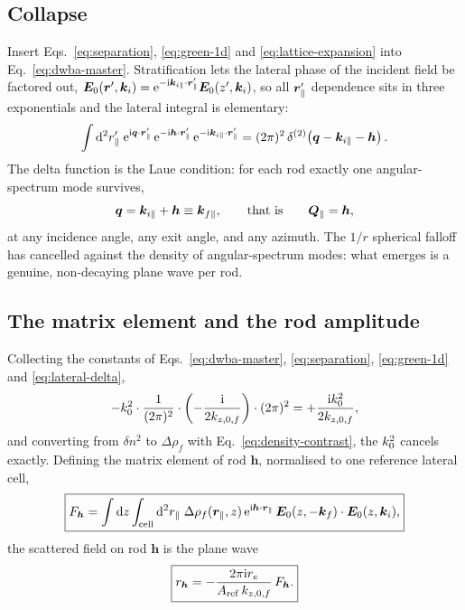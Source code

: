 \subsection{Collapse}

Insert Eqs.~\eqref{eq:separation}, \eqref{eq:green-1d} and
\eqref{eq:lattice-expansion} into Eq.~\eqref{eq:dwba-master}.  Stratification
lets the lateral phase of the incident field be factored out,
$\bm E_0(\bm r',\bm k_i)
=\mathrm{e}^{-\mathrm{i}\bm k_{i\parallel}\cdot\bm{r}_{\parallel}'}\bm E_0(z',\bm k_i)$, so all
$\bm{r}_{\parallel}'$ dependence sits in three exponentials and the lateral integral is
elementary:
\begin{equation}
  \int\mathop{}\!\mathrm{d}^2r_\parallel'\;
  \mathrm{e}^{\mathrm{i}\bm q\cdot\bm{r}_{\parallel}'}\,
  \mathrm{e}^{-\mathrm{i}\bm h\cdot\bm{r}_{\parallel}'}\,
  \mathrm{e}^{-\mathrm{i}\bm k_{i\parallel}\cdot\bm{r}_{\parallel}'}
  =(2\pi)^2\,\delta^{(2)}\!\left(\bm q-\bm k_{i\parallel}-\bm h\right).
  \label{eq:lateral-delta}
\end{equation}
The delta function is the Laue condition: for each rod exactly one
angular-spectrum mode survives,
\begin{equation}
  \bm q=\bm k_{i\parallel}+\bm h\equiv\bm k_{f\parallel},
  \qquad\text{that is}\qquad
  \bm{Q}_{\parallel}=\bm h,
  \label{eq:laue}
\end{equation}
at any incidence angle, any exit angle, and any azimuth.  The $1/r$ spherical
falloff has cancelled against the density of angular-spectrum modes: what
emerges is a genuine, non-decaying plane wave per rod.

\subsection{The matrix element and the rod amplitude}

Collecting the constants of Eqs.~\eqref{eq:dwba-master}, \eqref{eq:separation},
\eqref{eq:green-1d} and \eqref{eq:lateral-delta},
\begin{equation}
  -k_0^2\cdot\frac{1}{(2\pi)^2}
  \cdot\left(-\frac{\mathrm{i}}{2k_{z,0,f}}\right)\cdot(2\pi)^2
  =+\frac{\mathrm{i}k_0^2}{2k_{z,0,f}},
  \label{eq:constants}
\end{equation}
and converting from $\delta n^2$ to $\Delta\rho_f$ with
Eq.~\eqref{eq:density-contrast}, the $k_0^2$ cancels exactly.  Defining the
matrix element of rod $\bm h$, normalised to one reference lateral cell,
\begin{equation}
  \boxed{
  F_{\bm h}
  =\int\mathop{}\!\mathrm{d} z\int_{\rm cell}\mathop{}\!\mathrm{d}^2r_\parallel\;
   \Delta\rho_f(\bm{r}_{\parallel},z)\,
   \mathrm{e}^{\mathrm{i}\bm h\cdot\bm{r}_{\parallel}}\,
   \bm E_0(z,-\bm k_f)
   \mathbin{\cdot}
   \bm E_0(z,\bm k_i),
  }
  \label{eq:Fh-definition}
\end{equation}
the scattered field on rod $\bm h$ is the plane wave
\begin{equation}
  \boxed{
  r_{\bm h}
  =-\frac{2\pi\mathrm{i} r_e}{A_{\rm ref}\,k_{z,0,f}}\,F_{\bm h}.
  }
  \label{eq:rod-amplitude}
\end{equation}

